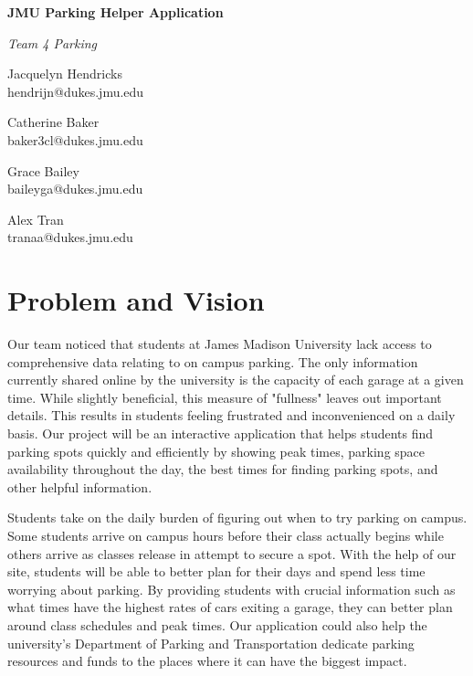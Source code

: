 \documentclass[11pt]{article}
\begin{document}

\begin{center}
\bfseries\huge
JMU Parking Helper Application
\end{center}

\begin{center}
\itshape\large
Team 4 Parking
\end{center}

\begin{multicols}{4}
\centering

Jacquelyn Hendricks \\
{\footnotesize hendrijn@dukes.jmu.edu}

Catherine Baker \\
{\footnotesize baker3cl@dukes.jmu.edu}

Grace Bailey \\
{\footnotesize baileyga@dukes.jmu.edu}

Alex Tran \\
{\footnotesize tranaa@dukes.jmu.edu}

\end{multicols}

\section*{Problem and Vision}



\qquad Our team noticed that students at James Madison University lack access to comprehensive data relating to on campus parking. The only information currently shared online by the university is the capacity of each garage at a given time. While slightly beneficial, this measure of "fullness" leaves out important details. This results in students feeling frustrated and inconvenienced on a daily basis. Our project will be an interactive application that helps students find parking spots quickly and efficiently by showing peak times, parking space availability throughout the day, the best times for finding parking spots, and other helpful information.

Students take on the daily burden of figuring out when to try parking on campus. Some students arrive on campus hours before their class actually begins while others arrive as classes release in attempt to secure a spot. With the help of our site, students will be able to better plan for their days and spend less time worrying about parking. By providing students with crucial information such as what times have the highest rates of cars exiting a garage, they can better plan around class schedules and peak times. Our application could also help the university's Department of Parking and Transportation dedicate parking resources and funds to the places where it can have the biggest impact. 
\end{document}
